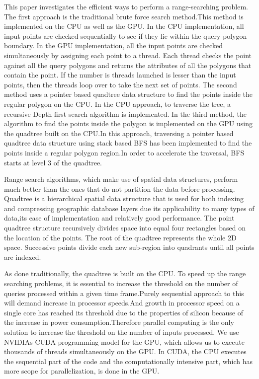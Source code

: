 \documentclass{article}
\begin{document}
This paper investigates the efficient ways to perform a range-searching problem.
The first approach is the traditional brute force search method.This method is implemented on the CPU as well as the GPU. In the CPU implementation, all input points are checked  sequentially to see if they lie within the query polygon boundary. In the GPU implementation, all the input points are checked simultaneously by assigning each point to a thread. Each thread checks the point against all the query polygons and returns the attributes of all the polygons that contain the point. If the number is threads launched is lesser than the input points, then the threads loop over to take the next set of points.
The second method uses a pointer based quadtree data structure to find the points inside the regular polygon on the CPU. In the CPU approach, to traverse the tree, a recursive Depth first search algorithm is implemented.
In the third method, the algorithm to find the points inside the polygon is implemented on the GPU  using the quadtree built on the CPU.In this approach, traversing a pointer based quadtree data structure using stack based BFS has been implemented to find the points inside a regular polygon region.In order to accelerate the traversal, BFS starts at level 3 of the quadtree.

Range search algorithms, which make use of spatial data structures, perform much better than the ones that do not partition the data before processing. Quadtree is a hierarchical spatial data structure that is used for both indexing and compressing geographic database layers due its applicability to many types of data,its ease of implementation and relatively good performance. The point quadtree structure recursively divides space into equal four rectangles based on the location of the points. The root of the quadtree represents the whole 2D space. Successive points divide each new sub-region into quadrants until all points are indexed.

As done traditionally, the quadtree is built on the CPU. To speed up the range searching problems, it is essential to increase the threshold on the number of queries processed within a given time frame.Purely sequential approach to this will demand increase in processor speeds.And growth in processor speed on a single core has reached its threshold due to the properties of silicon because of  the increase in power consumption.Therefore parallel computing is the only solution to increase the threshold on the number of inputs processed. 
We use NVIDIAs CUDA programming model for the GPU, which allows us to execute thousands of threads simultaneously on the GPU. In CUDA, the CPU executes the sequential part of the code and the computationally intensive part, which has more scope for parallelization, is done in the GPU. 
\end{document}

